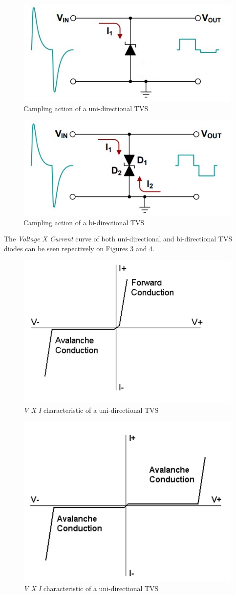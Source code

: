 			\begin{figure}[htbp]
				\centering
				\includegraphics[width=.5\textwidth]{figuras/fig-uni-tvs-clamp}
				\caption{Campling action of a uni-directional TVS \cite{uni-tvs-clamp}}
				\label{fig:uni-tvs-clamp}
			\end{figure}

			\begin{figure}[htbp]
				\centering
				\includegraphics[width=.5\textwidth]{figuras/fig-bi-tvs-clamp}
				\caption{Campling action of a bi-directional TVS \cite{bi-tvs-clamp}}
				\label{fig:bi-tvs-clamp}
			\end{figure}

			\par
			The \textit{Voltage X Current} curve of both uni-directional and bi-directional TVS diodes can be seen repectively on Figures \ref{fig:uni-tvs-curve} and \ref{fig:bi-tvs-curve}.

			\begin{figure}[htbp]
				\centering
				\includegraphics[width=.5\textwidth]{figuras/fig-uni-tvs-curve}
				\caption{\textit{V X I} characteristic of a uni-directional TVS \cite{uni-tvs-curve}}
				\label{fig:uni-tvs-curve}
			\end{figure}

			\begin{figure}[htbp]
				\centering
				\includegraphics[width=.5\textwidth]{figuras/fig-bi-tvs-curve}
				\caption{\textit{V X I} characteristic of a uni-directional TVS \cite{bi-tvs-curve}}
				\label{fig:bi-tvs-curve}
			\end{figure}


